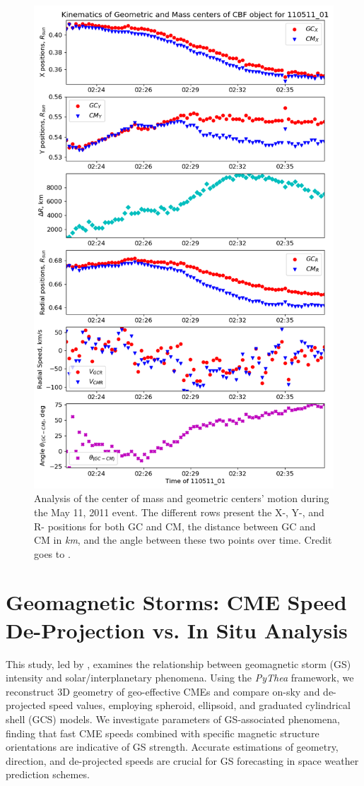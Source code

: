 \begin{figure}[!htp]
	\centering
	\includegraphics[width=0.7\hsize]{chapter2/figs/event_110511_01_centers_of_mass.png}
	\caption{Analysis of the center of mass and geometric centers' motion during the May 11, 2011 event. The different rows present the X-, Y-, and R- positions for both GC and CM, the distance between GC and CM in \textit{km}, and the angle between these two points over time. Credit goes to \citet{stepanyuk_2022}.}
	\label{fig_wavetrack_center_of_mass}
\end{figure}


\section{Geomagnetic Storms: CME Speed De-Projection vs. In Situ Analysis}
This study, led by \citet{miteva_2023}, examines the relationship between geomagnetic storm (GS) intensity and solar/interplanetary phenomena. Using the \textit{PyThea} framework, we reconstruct 3D geometry of geo-effective CMEs and compare on-sky and de-projected speed values, employing spheroid, ellipsoid, and graduated cylindrical shell (GCS) models. We investigate parameters of GS-associated phenomena, finding that fast CME speeds combined with specific magnetic structure orientations are indicative of GS strength. Accurate estimations of geometry, direction, and de-projected speeds are crucial for GS forecasting in space weather prediction schemes.

